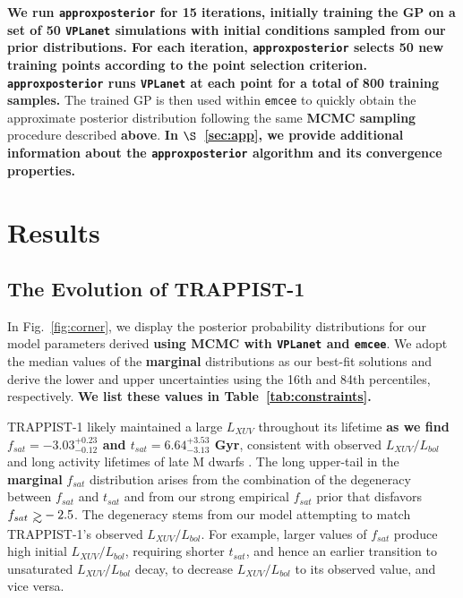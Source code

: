 \documentclass[twocolumn]{aastex62}
\def\gsim{~\rlap{$>$}{\lower 1.0ex\hbox{$\sim$}}}
\newcommand{\xxx}[1]{{\textbf{#1}}}
\newcommand{\vplanet}[0]{\texttt{VPLanet}\xspace}
\newcommand{\emcee}[0]{\texttt{emcee}\xspace}
\newcommand{\approxposterior}[0]{\texttt{approxposterior}\xspace}
\begin{document}
\xxx{We run \approxposterior for 15 iterations, initially training the GP on a set of 50 \vplanet simulations with initial conditions sampled from our prior distributions. For each iteration, \approxposterior selects 50 new training points according to the \citet{Kandasamy2017} point selection criterion. \approxposterior runs \vplanet at each point for a total of 800 training samples.} The trained GP is then used within \emcee to quickly obtain the approximate posterior distribution following the same \xxx{MCMC sampling} procedure described \xxx{above}. \xxx{In $\S$~\ref{sec:app}, we provide additional information about the \approxposterior algorithm and its convergence properties.}


\section{Results} \label{sec:results}

\subsection{The Evolution of TRAPPIST-1}

In Fig.~\ref{fig:corner}, we display the posterior probability distributions for our model parameters derived \xxx{using MCMC with \vplanet and \emcee}. We adopt the median values of the \xxx{marginal} distributions as our best-fit solutions and derive the lower and upper uncertainties using the 16th and 84th percentiles, respectively. \xxx{We list these values in Table~\ref{tab:constraints}.}

TRAPPIST-1 likely maintained a large $L_{XUV}$ throughout its lifetime \xxx{as we find $f_{sat} = -3.03^{+0.23}_{-0.12}$ and $t_{sat} = 6.64^{+3.53}_{-3.13}$ Gyr}, consistent with observed $L_{XUV}/L_{bol}$ and long activity lifetimes of late M dwarfs \citep{West2008,Wright2018}. The long upper-tail in the \xxx{marginal} $f_{sat}$ distribution arises from the combination of the degeneracy between $f_{sat}$ and $t_{sat}$ and from our strong empirical $f_{sat}$ prior that disfavors $f_{sat} \gsim -2.5$. The degeneracy stems from our model attempting to match TRAPPIST-1's observed \xxx{$L_{XUV}/L_{bol}$}. For example, larger values of $f_{sat}$ produce high initial \xxx{$L_{XUV}/L_{bol}$}, requiring shorter $t_{sat}$, and hence an earlier transition to unsaturated \xxx{$L_{XUV}/L_{bol}$} decay, to decrease \xxx{$L_{XUV}/L_{bol}$} to its observed value, and vice versa. 
\end{document}
